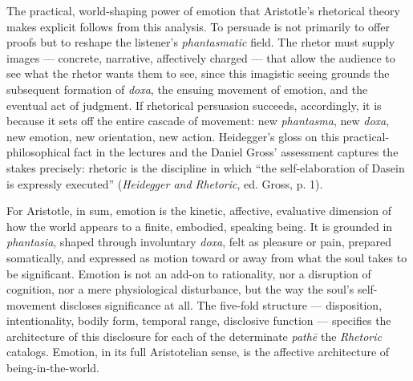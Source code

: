 \documentclass{article}
\begin{document}
The practical, world-shaping power of emotion that Aristotle's rhetorical theory makes explicit follows from this analysis. To persuade is not primarily to offer proofs but to reshape the listener's \textit{phantasmatic} field. The rhetor must supply images --- concrete, narrative, affectively charged --- that allow the audience to see what the rhetor wants them to see, since this imagistic seeing grounds the subsequent formation of \textit{doxa}, the ensuing movement of emotion, and the eventual act of judgment. If rhetorical persuasion succeeds, accordingly, it is because it sets off the entire cascade of movement: new \textit{phantasma}, new \textit{doxa}, new emotion, new orientation, new action. Heidegger's gloss on this practical-philosophical fact in the lectures and the Daniel Gross' assessment captures the stakes precisely: rhetoric is the discipline in which ``the self-elaboration of Dasein is expressly executed'' (\textit{Heidegger and Rhetoric}, ed. Gross, p. 1).

For Aristotle, in sum, emotion is the kinetic, affective, evaluative dimension of how the world appears to a finite, embodied, speaking being. It is grounded in \textit{phantasia}, shaped through involuntary \textit{doxa}, felt as pleasure or pain, prepared somatically, and expressed as motion toward or away from what the soul takes to be significant. Emotion is not an add-on to rationality, nor a disruption of cognition, nor a mere physiological disturbance, but the way the soul's self-movement discloses significance at all. The five-fold structure --- disposition, intentionality, bodily form, temporal range, disclosive function --- specifies the architecture of this disclosure for each of the determinate \textit{pathē} the \textit{Rhetoric} catalogs. Emotion, in its full Aristotelian sense, is the affective architecture of being-in-the-world.
\end{document}
